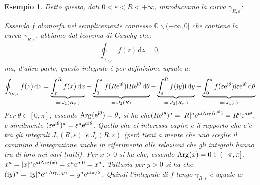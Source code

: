 \documentclass[11pt]{book}
\theoremstyle{Definizione}
\theoremstyle{TeoremaProposizioneLemmaCorollarioCongettura}
\theoremstyle{OsservazioneNotaEsempio}
\newtheorem{myes}{Esempio}[section]
\newcommand{\R}{\mathbb{R}}
\newcommand{\C}{\mathbb{C}}
\newcommand{\tolto}{\smallsetminus}
\newcommand{\Arg}[1][]{\textup{Arg}_{#1}}
\renewcommand{\i}{\textup{i}}
\newcommand{\e}{\textup{e}}
\renewcommand{\d}{\mathrm{d}}
\newcommand{\dz}{\,\d z}
\newcommand{\dx}{\,\d x}
\newcommand{\dy}{\,\d y}
\newcommand{\dtheta}{\, \d \theta}
\newcommand{\frecciaIn}{
\tikz \draw[-latex] (-1pt,0) -- (1pt,0);
}
\newcommand{\frecciaOut}{
\tikz \draw[latex-] (-1pt,0) -- (1pt,0);
}
\begin{document}
\begin{myes}
Detto questo, dati $0 < \varepsilon < R < +\infty$, introduciamo la curva $\gamma_{R,\varepsilon}$:
\begin{center}
\end{center}
Essendo $f$ olomorfa nel semplicemente connesso $\C\tolto (-\infty,0]$ che contiene la curva $\gamma_{R,\varepsilon}$, abbiamo dal teorema di Cauchy che:
$$
\oint_{\gamma_{R,\varepsilon}} f(z)\dz = 0,
$$
ma, d'altra parte, questo integrale è per definizione uguale a:
$$
\oint_{\gamma_{R,\varepsilon}} f(z)\dz = \underbrace{\int_{\varepsilon}^{R} f(x)\dx}_{=: J_1(R,\varepsilon)} + \underbrace{\int_0^\pi f(R\e^{\i\theta})\i R\e^{\i\theta}\dtheta}_{=:J_2(R)} - \underbrace{\int_{\varepsilon}^{R} f(\i y) \i \dy }_{=: J_3(R,\varepsilon)} - \underbrace{\int_{0}^\pi f(\varepsilon\e^{\i\theta})\i\varepsilon\e^{\i\theta}\dtheta}_{=:J_4(\varepsilon)}
$$
Per $\theta\in [0,\pi]$, essendo $\Arg(\e^{\i\theta}) = \theta$, si ha che$(R\e^{\i\theta})^{a} = |R|^{a}\e^{a \i\Arg(\e^{\i\theta})} = R^a \e^{a \i\theta}$, e similmente $(\varepsilon\e^{\i\theta})^a = \varepsilon^a \e^{a \i\theta}$. Quello che ci interessa capire è il rapporto che c'è tra gli integrali $J_1(R,\varepsilon)$ e $J_r(R,\varepsilon)$ (però tieni a mente che uno sceglie il cammino d'integrazione anche in riferimento alle relazioni che gli integrali hanno tra di loro nei vari tratti). Per $x > 0$ si ha che, essendo $\Arg(x) = 0 \in (-\pi,\pi]$, $x^a = |x|^a \e^{a \i\Arg(x)} = x^a \e^{a \cdot 0} =x^a$. Tuttavia per $y > 0$ si ha che $(\i y)^a = |\i y|^a \e^{a \i \Arg(\i y)} = y^a \e^{a \i \pi/2}$. Quindi l'integrale di $f$ lungo $\gamma_{R,\varepsilon}$ è uguale a:

\end{myes}
\end{document}
